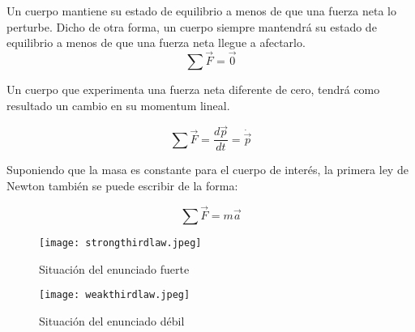\documentclass[/home/hernan/Documentos/Apuntes_mecanica_teorica/main.tex]{subfiles}
\begin{document}
	\begin{definition}
		Un cuerpo mantiene su estado de equilibrio a menos de que una fuerza neta lo perturbe. Dicho de otra forma, un cuerpo siempre mantendrá su estado de equilibrio a menos de que una fuerza neta llegue a afectarlo.
		\begin{equation}
			\sum \vec{F} = \vec{0}
			\label{eq: Nfirstlaw}
		\end{equation}
		
	\end{definition}

	
	\begin{definition}
		Un cuerpo que experimenta una fuerza neta diferente de cero, tendrá como resultado un cambio en su momentum lineal.
		
		\begin{equation}
			\sum \vec{F} = \frac{d \vec{p}}{dt} = \dot{\vec{p}}
			\label{eq: NSecondlaw}
		\end{equation}

		Suponiendo que la masa es constante para el cuerpo de interés, la primera ley de Newton también se puede escribir de la forma:

		\begin{equation}
			\sum \vec{F} = m \vec{a}
		\end{equation}
	\end{definition}


	\begin{marginfigure}
		\begin{figure}[H]
			\centering
			\texttt{[image: strongthirdlaw.jpeg]}
			\caption{Situación del enunciado fuerte}
			\label{fig:Nthirdstrong}
		\end{figure}
	\end{marginfigure}

	\begin{marginfigure}
		\begin{figure}[H]
			\centering
			\texttt{[image: weakthirdlaw.jpeg]}
			\caption{Situación del enunciado débil}
			\label{fig:Nthirdweak}
		\end{figure}
	\end{marginfigure}
\end{document}
